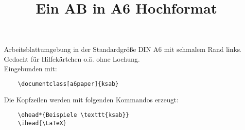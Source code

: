 \documentclass[a6paper]{ksab}
\title{Ein AB in A6 Hochformat}
\begin{document}
  \maketitle
  
  Arbeitsblattumgebung in der Standardgröße DIN A6 mit schmalem Rand links. Gedacht für Hilfekärtchen o.ä. ohne Lochung.\\
  Eingebunden mit:
  \begin{verbatim}
    \documentclass[a6paper]{ksab}
  \end{verbatim}
  
  Die Kopfzeilen werden mit folgenden Kommandos erzeugt:
  \begin{verbatim}
    \ohead*{Beispiele \texttt{ksab}}
    \ihead{\LaTeX}
  \end{verbatim}
  
\end{document}
